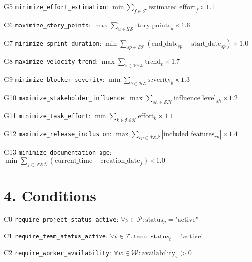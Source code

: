 \documentclass[12pt]{article}
\begin{document}
    \item[G5] \texttt{minimize\_effort\_estimation}: 
    $\min \sum_{f \in \mathcal{F}} \text{estimated\_effort}_f \times 1.1$
    
    \item[G6] \texttt{maximize\_story\_points}: 
    $\max \sum_{u \in \mathcal{US}} \text{story\_points}_u \times 1.6$
    
    \item[G7] \texttt{minimize\_sprint\_duration}: 
    $\min \sum_{sp \in \mathcal{SP}} (\text{end\_date}_{sp} - \text{start\_date}_{sp}) \times 1.0$
    
    \item[G8] \texttt{maximize\_velocity\_trend}: 
    $\max \sum_{v \in \mathcal{VEL}} \text{trend}_v \times 1.7$
    
    \item[G9] \texttt{minimize\_blocker\_severity}: 
    $\min \sum_{b \in \mathcal{BL}} \text{severity}_b \times 1.3$
    
    \item[G10] \texttt{maximize\_stakeholder\_influence}: 
    $\max \sum_{sh \in \mathcal{SH}} \text{influence\_level}_{sh} \times 1.2$
    
    \item[G11] \texttt{minimize\_task\_effort}: 
    $\min \sum_{k \in \mathcal{TSK}} \text{effort}_k \times 1.1$
    
    \item[G12] \texttt{maximize\_release\_inclusion}: 
    $\max \sum_{rp \in \mathcal{REP}} |\text{included\_features}_{rp}| \times 1.4$
    
    \item[G13] \texttt{minimize\_documentation\_age}: 
    $\min \sum_{f \in \mathcal{FED}} (\text{current\_time} - \text{creation\_date}_f) \times 1.0$

\section{4. Conditions}
\item[C0] \texttt{require\_project\_status\_active}: 
    $\forall p \in \mathcal{P}: \text{status}_p = \text{"active"}$
    
    \item[C1] \texttt{require\_team\_status\_active}: 
    $\forall t \in \mathcal{T}: \text{team\_status}_t = \text{"active"}$
    
    \item[C2] \texttt{require\_worker\_availability}: 
    $\forall w \in \mathcal{W}: \text{availability}_w > 0$
    
\end{document}

